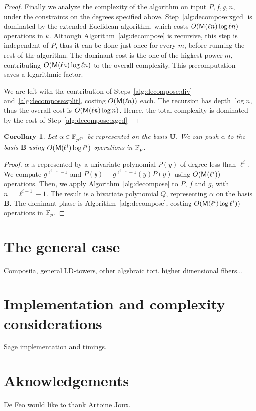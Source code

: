 \documentclass{sig-alternate}
\newcommand{\bb}{\mathbf{B}}
\newcommand{\uu}{\mathbf{U}}  %
\newtheorem{corollary}[theorem]{Corollary}
\begin{document}
\begin{proof}
  Finally we analyze the complexity of the algorithm on input $P, f,
  g, n$, under the constraints on the degrees specified
  above. Step~\ref{alg:decompose:xgcd} is dominated by the extended
  Euclidean algorithm, which costs $O(\mathsf{M}(\ell n)\log \ell n)$
  operations in $k$. Although Algorithm~\ref{alg:decompose} is
  recursive, this step is independent of $P$, thus it can be done just
  once for every $m$, before running the rest of the algorithm. The
  dominant cost is the one of the highest power $m$, contributing
  $O(\mathsf{M}(\ell n)\log \ell n)$ to the overall complexity. This
  precomputation saves a logarithmic factor.

  We are left with the contribution of Steps~\ref{alg:decompose:div}
  and~\ref{alg:decompose:split}, costing $O(\mathsf{M}(\ell n))$ each. The
  recursion has depth $\log n$, thus the overall cost is $O(\mathsf{M}(\ell
  n)\log n)$. Hence, the total complexity is dominated by the cost of
  Step~\ref{alg:decompose:xgcd}.
\end{proof}

\begin{corollary}
  Let $\alpha\in\mathbb{F}_{p^{\ell^i}}$ be represented on the basis $\uu$. We
  can \emph{push} $\alpha$ to the basis $\bb$ using
  $O(\mathsf{M}(\ell^i)\log\ell^i)$ operations in $\mathbb{F}_p$.
\end{corollary}
\begin{proof}
  $\alpha$ is represented by a univariate polynomial $P(y)$ of degree
  less than $\ell^i$. We compute $g^{\ell^{i-1}-1}$ and $\bar{P}(y) =
  g^{\ell^{i-1}-1}(y)P(y)$ using $O(\mathsf{M}(\ell^i))$ operations. Then,
  we apply Algorithm~\ref{alg:decompose} to $\bar{P}$, $f$ and $g$,
  with $n=\ell^{i-1}-1$. The result is a bivariate polynomial $Q$,
  representing $\alpha$ on the basis $\mathbf{B}$. The dominant phase
  is Algorithm~\ref{alg:decompose}, costing
  $O(\mathsf{M}(\ell^i)\log\ell^i))$ operations in $\mathbb{F}_p$.
\end{proof}


\section{The general case}
\label{sec:general}

Composita, general LD-towers, other algebraic tori, higher dimensional
fibers...


\section{Implementation and complexity considerations}
\label{sec:impl}

Sage implementation and timings.


\section{Aknowledgements}
De Feo would like to thank Antoine Joux.



\end{document}
